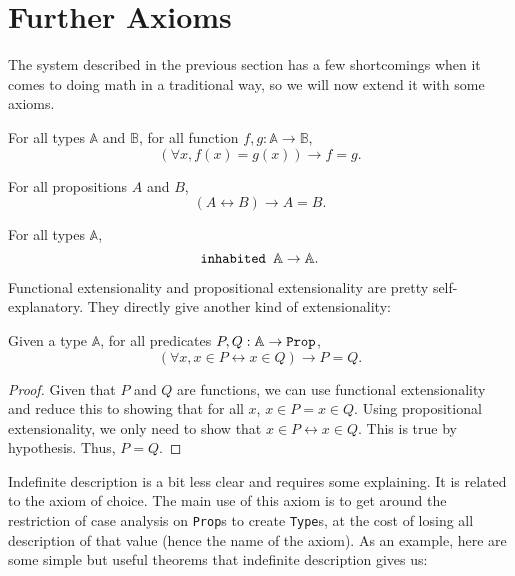 \documentclass[../../math.tex]{subfiles}
\begin{document}
\section{Further Axioms}

The system described in the previous section has a few shortcomings when it
comes to doing math in a traditional way, so we will now extend it with some
axioms.

\begin{axiom}
    For all types $\mathbb A$ and $\mathbb B$, for all function $f, g : \mathbb
    A \rightarrow \mathbb B$,
    \[
        (\forall x, f(x) = g(x)) \rightarrow f = g.
    \]
\end{axiom}

\begin{axiom}
    For all propositions $A$ and $B$,
    \[
        (A \leftrightarrow B) \rightarrow A = B.
    \]
\end{axiom}

\begin{axiom}
    For all types $\mathbb A$,
    \[
        \verb|inhabited | \mathbb A \rightarrow \mathbb A.
    \]
\end{axiom}

Functional extensionality and propositional extensionality are pretty
self-explanatory.  They directly give another kind of extensionality:

\begin{theorem}
    Given a type $\mathbb A$, for all predicates $P, Q : \mathbb A \rightarrow
    \verb|Prop|$,
    \[
        (\forall x, x \in P \leftrightarrow x \in Q) \rightarrow P = Q.
    \]
\end{theorem}
\begin{proof}
    Given that $P$ and $Q$ are functions, we can use functional extensionality
    and reduce this to showing that for all $x$, $x \in P = x \in Q$.  Using
    propositional extensionality, we only need to show that $x \in P
    \leftrightarrow x \in Q$.  This is true by hypothesis.  Thus, $P = Q$.
\end{proof}

Indefinite description is a bit less clear and requires some explaining.  It is
related to the axiom of choice.  The main use of this axiom is to get around the
restriction of case analysis on \verb|Prop|s to create \verb|Type|s, at the cost
of losing all description of that value (hence the name of the axiom).  As an
example, here are some simple but useful theorems that indefinite description
gives us:
\end{document}
